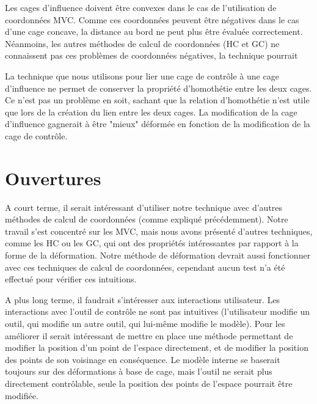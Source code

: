 Les cages d'influence doivent être convexes dans le cas de l'utilisation de
coordonnées MVC. Comme ces coordonnées peuvent être négatives dans le cas
d'une cage concave, la distance au bord ne peut plus être évaluée
correctement. Néanmoins, les autres méthodes de calcul de coordonnées (HC et GC)
ne connaissent pas ces problèmes de coordonnées négatives, la technique
pourrait 

La technique que nous utilisons pour lier une cage de contrôle à une cage
d'influence ne permet de conserver la propriété d'homothétie entre les deux
cages. Ce n'est pas un problème en soit, sachant que la relation d'homothétie
n'est utile que lors de la création du lien entre les deux cages. La
modification de la cage d'influence gagnerait à être "mieux" déformée en
fonction de la modification de la cage de contrôle.

\section{Ouvertures}

A court terme, il serait intéressant d'utiliser notre technique avec d'autres
méthodes de calcul de coordonnées (comme expliqué précédemment). Notre travail
s'est concentré sur les MVC, mais nous avons présenté d'autres techniques,
comme les HC ou les GC, qui ont des propriétés intéressantes par rapport à la
forme de la déformation. Notre méthode de déformation devrait aussi
fonctionner avec ces techniques de calcul de coordonnées, cependant aucun test
n'a été effectué pour vérifier ces intuitions.

A plus long terme, il faudrait s'intéresser aux interactions utilisateur. Les
interactions avec l'outil de contrôle ne sont pas intuitives (l'utilisateur
modifie un outil, qui modifie un autre outil, qui lui-même modifie le modèle).
Pour les améliorer il serait intéressant de mettre en place une méthode
permettant de modifier la position d'un point de l'espace directement, et de
modifier la position des points de son voisinage en conséquence. Le modèle
interne se baserait toujours sur des déformations à base de cage, mais l'outil
ne serait plus directement contrôlable, seule la position des points de
l'espace pourrait être modifiée.
